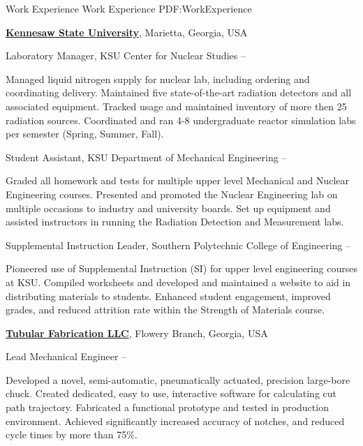 \documentclass[
letterpaper,
MMMyyyy,
nonstopmode,
draftmode,
]{resume}
\begin{document}
\begin{Body}

\Section
{Work Experience}
{Work Experience}
{PDF:WorkExperience}

\Entry
\href{http://kennesaw.edu/}
{\textbf{Kennesaw State University}},
Marietta, Georgia, USA

\Gap
\BulletItem
Laboratory Manager,
KSU Center for Nuclear Studies
\hfill
{} --
\begin{Detail}
\SubBulletItem
Managed liquid nitrogen supply for nuclear lab, including ordering and coordinating delivery.
\SubBulletItem
Maintained five state-of-the-art radiation detectors and all associated equipment.
\SubBulletItem
Tracked usage and maintained inventory of more then 25 radiation sources.
\SubBulletItem
Coordinated and ran 4-8 undergraduate reactor simulation labs per semester (Spring, Summer, Fall).
\end{Detail}

\Gap
\BulletItem
Student Assistant,
KSU Department of Mechanical Engineering
\hfill
{} --
\begin{Detail}
\SubBulletItem
Graded all homework and tests for multiple upper level Mechanical and Nuclear Engineering courses.
\SubBulletItem
Presented and promoted the Nuclear Engineering lab on multiple occasions to industry and university boards.
\SubBulletItem
Set up equipment and assisted instructors in running the Radiation Detection and Measurement labs.
\end{Detail}

\Gap
\BulletItem
Supplemental Instruction Leader,
Southern Polytechnic College of Engineering
\hfill
{} --
\begin{Detail}
\SubBulletItem
Pioneered use of Supplemental Instruction (SI) for upper level engineering courses at KSU.
\SubBulletItem
Compiled worksheets and developed and maintained a website to aid in distributing materials to students.
\SubBulletItem
Enhanced student engagement, improved grades, and reduced attrition rate within the Strength of Materials course.
\end{Detail}


\BigGap
\Entry
\href{http://tubularfab.com}
{\textbf{Tubular Fabrication LLC}},
Flowery Branch, Georgia, USA

\Gap
\BulletItem
Lead Mechanical Engineer
\hfill
{} --
\begin{Detail}
\SubBulletItem
Developed a novel, semi-automatic, pneumatically actuated, precision large-bore chuck.
\SubBulletItem
Created dedicated, easy to use, interactive software for calculating cut path trajectory.
\SubBulletItem
Fabricated a functional prototype and tested in production environment.
\SubBulletItem
Achieved significantly increased accuracy of notches, and reduced cycle times by more than 75\%.
\end{Detail}



\end{Body}
\end{document}
